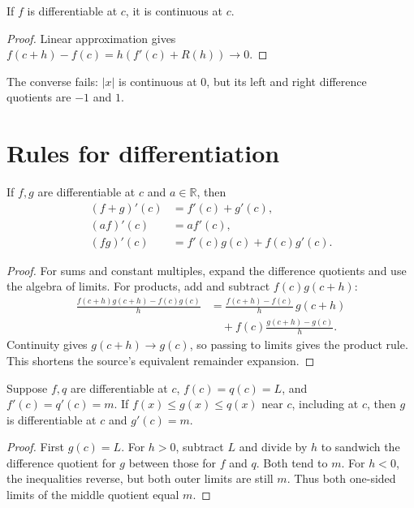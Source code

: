 \begin{theorem}
If $f$ is differentiable at $c$, it is continuous at $c$.
\end{theorem}
\begin{proof}
Linear approximation gives $f(c+h)-f(c)=h(f'(c)+R(h))\to0$.
\end{proof}
The converse fails: $|x|$ is continuous at $0$, but its left and right
difference quotients are $-1$ and $1$.

\section{Rules for differentiation}
\begin{theorem}
If $f,g$ are differentiable at $c$ and $a\in\mathbb R$, then
\begin{align*}
(f+g)'(c)&=f'(c)+g'(c),\\
(af)'(c)&=af'(c),\\
(fg)'(c)&=f'(c)g(c)+f(c)g'(c).
\end{align*}
\end{theorem}
\begin{proof}
For sums and constant multiples, expand the difference quotients and use
the algebra of limits. For products, add and subtract $f(c)g(c+h)$:
\begin{align*}
\frac{f(c+h)g(c+h)-f(c)g(c)}h
&=\frac{f(c+h)-f(c)}h\,g(c+h)\\
&\quad+f(c)\frac{g(c+h)-g(c)}h.
\end{align*}
Continuity gives $g(c+h)\to g(c)$, so passing to limits gives the product
rule. This shortens the source's equivalent remainder expansion.
\end{proof}

\begin{theorem}
Suppose $f,q$ are differentiable at $c$, $f(c)=q(c)=L$, and
$f'(c)=q'(c)=m$. If $f(x)\leq g(x)\leq q(x)$ near $c$, including at $c$,
then $g$ is differentiable at $c$ and $g'(c)=m$.
\end{theorem}
\begin{proof}
First $g(c)=L$. For $h>0$, subtract $L$ and divide by $h$ to sandwich the
difference quotient for $g$ between those for $f$ and $q$. Both tend to $m$.
For $h<0$, the inequalities reverse, but both outer limits are still $m$.
Thus both one-sided limits of the middle quotient equal $m$.
\end{proof}

